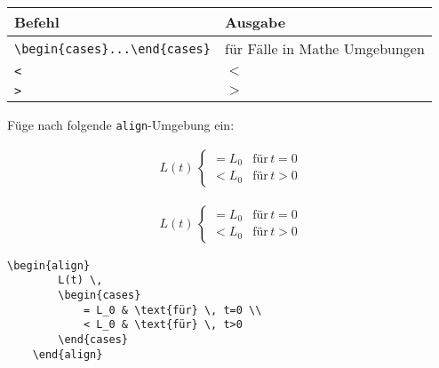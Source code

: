 \documentclass["WS\space 16-17\space -\space LaTeX-Kurs\space -\space Praesentation\space -\space 1.tex"]{subfiles}
\begin{document}
\begin{frame}[fragile]
	\begin{center}
		\begin{tabular}{ll}
			\toprule
			Befehl									&	Ausgabe		\\ \midrule
			\lstinline|\begin{cases}...\end{cases}|	&	für Fälle in Mathe Umgebungen	\\
			\lstinline|<|							&	$<$		\\
			\lstinline|>|							&	$>$		\\
			\bottomrule
		\end{tabular}
	\end{center}
	\pause\btVFill
	\Aufgabee
	Füge nach  folgende \lstinline[basicstyle=\normalfont\normalsize]|align|-Umgebung ein:
	\begin{outputbox}
	    \begin{align}
	      L(t) \,
	      \begin{cases}
	        = L_0 & \text{für} \, t=0 \\
	        < L_0 & \text{für} \, t>0
	      \end{cases}
	    \end{align}
    \end{outputbox}
	\vspace{0.3cm}
\end{frame}
\begin{frame}[fragile]
	\Losung
	\begin{outputbox}
	    \begin{align}
			L(t) \,
			\begin{cases}
				= L_0 & \text{für} \, t=0 \\
				< L_0 & \text{für} \, t>0
			\end{cases}
	    \end{align}
	\end{outputbox}

	\Code
	\begin{lstlisting}[gobble=4]
	\begin{align}
		L(t) \,
		\begin{cases}
			= L_0 & \text{für} \, t=0 \\
			< L_0 & \text{für} \, t>0
		\end{cases}
	\end{align}
	\end{lstlisting}
\end{frame}
\end{document}
